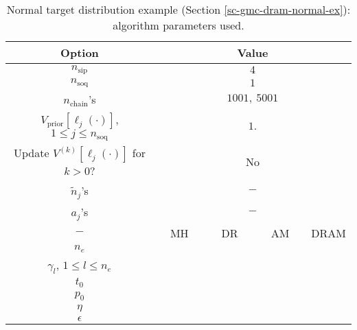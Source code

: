 \begin{table}[h!]
\begin{center}
\begin{tabular}{|c|c|c|c|c|}
\hline
Option                                            & \multicolumn{4}{c|}{Value}                                   \\
\hline
\hline
$n_{\text{sip}}$                                  & \multicolumn{4}{c|}{$4$}                                     \\
\hline
$n_{\text{soq}}$                                  & \multicolumn{4}{c|}{$1$}                                     \\
\hline
$n_{\text{chain}}$'s                              & \multicolumn{4}{c|}{$1001,~5001$}                            \\
\hline
\hline
$V_{\text{prior}}[\ell_j(\cdot)]$,
$1\leqslant j\leqslant n_{\text{soq}}$            & \multicolumn{4}{c|}{$1.$}                                    \\
\hline
Update $V^{(k)}[\ell_j(\cdot)]$ for $k>0$?        & \multicolumn{4}{c|}{No}                                      \\
\hline
${\tilde{n}}_j$'s                                 & \multicolumn{4}{c|}{$-$}                                     \\
\hline
$a_j$'s                                           & \multicolumn{4}{c|}{$-$}                                     \\
\hline
\hline
$-$                                               & ~~MH~~            & ~~DR~~       & ~~AM~~       & DRAM       \\
\hline
$n_e$                                             &                   &              &              &            \\
\hline
$\gamma_l$,
$1\leqslant l\leqslant n_e$                       &                   &              &              &            \\
\hline
\hline
$t_0$                                             &                   &              &              &            \\
\hline
$p_0$                                             &                   &              &              &            \\
\hline
$\eta$                                            &                   &              &              &            \\
\hline
$\epsilon$                                        &                   &              &              &            \\
\hline
\end{tabular}
\caption{Normal target distribution example (Section \ref{sc-gmc-dram-normal-ex}):
algorithm parameters used.
}
\label{tab-dram-normal-ex-alg-params}
\end{center}
\end{table}

